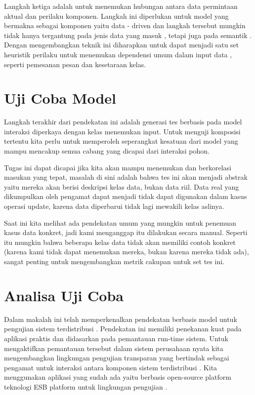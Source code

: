 \documentclass{jtetiproposalskripsi}
\begin{document}
Langkah ketiga adalah untuk menemukan hubungan antara data permintaan aktual dan perilaku komponen. Langkah ini diperlukan untuk model yang bermakna sebagai komponen yaitu data - driven dan langkah tersebut  mungkin tidak hanya tergantung pada jenis data yang masuk , tetapi juga pada semantik . Dengan mengembangkan teknik ini diharapkan untuk dapat menjadi satu set heuristik perilaku untuk menemukan dependensi umum dalam input data , seperti pemesanan pesan dan kesetaraan kelas.

\section{Uji Coba Model}
Langkah terakhir dari pendekatan ini adalah generasi tes berbasis pada model interaksi diperkaya dengan kelas menemukan input. Untuk menguji komposisi tertentu kita perlu untuk memperoleh seperangkat kesatuan dari model yang mampu mencakup semua cabang yang dicapai dari interaksi pohon. 

Tugas ini dapat dicapai jika kita akan mampu menemukan dan berkorelasi masukan yang tepat, masalah di sini adalah bahwa tes ini akan menjadi abstrak yaitu mereka akan berisi deskripsi kelas data, bukan data riil. Data real yang dikumpulkan oleh pengamat dapat menjadi tidak dapat digunakan dalam kasus operasi update, karena data diperbarui tidak lagi mewakili kelas aslinya.
 
Saat ini kita melihat ada pendekatan umum yang mungkin untuk penemuan kasus data konkret, jadi kami menganggap itu dilakukan secara manual. Seperti itu mungkin bahwa beberapa kelas data tidak akan memiliki contoh konkret (karena kami tidak dapat menemukan mereka, bukan karena mereka tidak ada), sangat penting untuk mengembangkan metrik cakupan untuk set tes ini.

\section{Analisa Uji Coba}
Dalam makalah ini telah memperkenalkan pendekatan berbasis model untuk pengujian sistem terdistribusi . Pendekatan ini memiliki penekanan kuat pada aplikasi praktis dan didasarkan pada pemantauan run-time sistem. Untuk mengaktifkan pemantauan tersebut dalam sistem perusahaan nyata kita mengembangkan lingkungan pengujian transparan yang bertindak sebagai pengamat untuk interaksi antara komponen sistem terdistribusi . Kita menggunakan aplikasi yang sudah ada yaitu berbasis open-source platform teknologi ESB platform untuk lingkungan pengujian .
\end{document}
